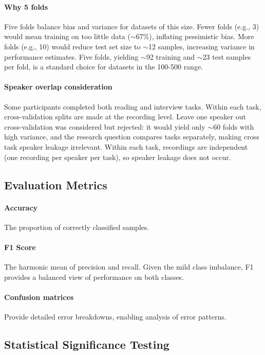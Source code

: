 \paragraph{Why 5 folds} Five folds balance bias and variance for datasets of this size. Fewer folds (e.g., 3) would mean training on too little data ($\sim$67\%), inflating pessimistic bias. More folds (e.g., 10) would reduce test set size to $\sim$12 samples, increasing variance in performance estimates. Five folds, yielding $\sim$92 training and $\sim$23 test samples per fold, is a standard choice for datasets in the 100-500 range.

\paragraph{Speaker overlap consideration} Some participants completed both reading and interview tasks. Within each task, cross-validation splits are made at the recording level. Leave one speaker out cross-validation was considered but rejected: it would yield only $\sim$60 folds with high variance, and the research question compares tasks separately, making cross task speaker leakage irrelevant. Within each task, recordings are independent (one recording per speaker per task), so speaker leakage does not occur.

\subsection{Evaluation Metrics}

\paragraph{Accuracy} The proportion of correctly classified samples.

\paragraph{F1 Score} The harmonic mean of precision and recall. Given the mild class imbalance, F1 provides a balanced view of performance on both classes.

\paragraph{Confusion matrices} Provide detailed error breakdowns, enabling analysis of error patterns.

\subsection{Statistical Significance Testing}

